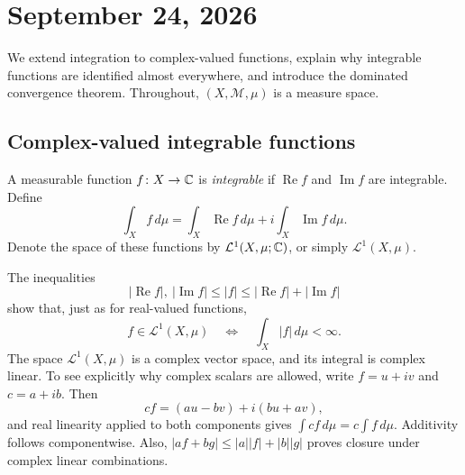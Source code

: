 \section{September 24, 2026}

We extend integration to complex-valued functions, explain why
integrable functions are identified almost everywhere, and introduce
the dominated convergence theorem. Throughout, $(X,\mathcal M,\mu)$ is
a measure space.

\subsection{Complex-valued integrable functions}

\begin{definition}
  A measurable function $f\colon X\to\mathbb{C}$ is \emph{integrable} if
  $\operatorname{Re}f$ and $\operatorname{Im}f$ are integrable. Define
  \[
    \int_X f\,d\mu
      =\int_X\operatorname{Re}f\,d\mu
       +i\int_X\operatorname{Im}f\,d\mu.
  \]
  Denote the space of these functions by
  $\mathcal L^1(X,\mu;\mathbb{C})$, or simply $\mathcal L^1(X,\mu)$.
\end{definition}

The inequalities
\[
  |\operatorname{Re}f|,\ |\operatorname{Im}f|\leq|f|
  \leq|\operatorname{Re}f|+|\operatorname{Im}f|
\]
show that, just as for real-valued functions,
\[
  f\in\mathcal L^1(X,\mu)
  \quad\Longleftrightarrow\quad\int_X|f|\,d\mu<\infty.
\]
The space $\mathcal L^1(X,\mu)$ is a complex vector space, and its
integral is complex linear. To see explicitly why complex scalars are
allowed, write $f=u+iv$ and $c=a+ib$. Then
\[
  cf=(au-bv)+i(bu+av),
\]
and real linearity applied to both components gives
$\int cf\,d\mu=c\int f\,d\mu$. Additivity follows componentwise.
Also, $|af+bg|\leq|a||f|+|b||g|$ proves closure under complex linear
combinations.

